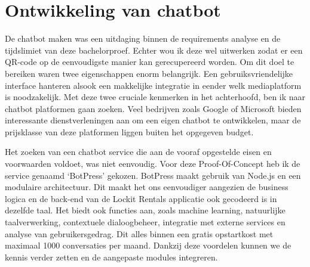 \newpage

\section{Ontwikkeling van chatbot}%

De chatbot maken was een uitdaging binnen de requirements analyse en de tijdslimiet van deze bachelorproef. Echter wou ik deze wel uitwerken zodat er een QR-code op de eenvoudigste manier kan gerecupereerd worden. Om dit doel te bereiken waren twee eigenschappen enorm belangrijk. Een gebruiksvriendelijke interface hanteren alsook een makkelijke integratie in eender welk mediaplatform is noodzakelijk. Met deze twee cruciale kenmerken in het achterhoofd, ben ik naar chatbot platformen gaan zoeken. Veel bedrijven zoals Google of Microsoft bieden interessante dienstverleningen aan om een eigen chatbot te ontwikkelen, maar de prijsklasse van deze platformen liggen buiten het opgegeven budget.

Het zoeken van een chatbot service die aan de vooraf opgestelde eisen en voorwaarden voldoet, was niet eenvoudig. Voor deze Proof-Of-Concept heb ik de service genaamd ‘BotPress’ gekozen. BotPress maakt gebruik van Node.js en een modulaire architectuur. Dit maakt het ons eenvoudiger aangezien de business logica en de back-end van de Lockit Rentals applicatie ook gecodeerd is in dezelfde taal. Het biedt ook functies aan, zoals machine learning, natuurlijke taalverwerking, contextuele dialoogbeheer, integratie met externe services en analyse van gebruikersgedrag. Dit alles binnen een gratis opstartkost met maximaal 1000 conversaties per maand. Dankzij deze voordelen kunnen we de kennis verder zetten en de aangepaste modules integreren.

